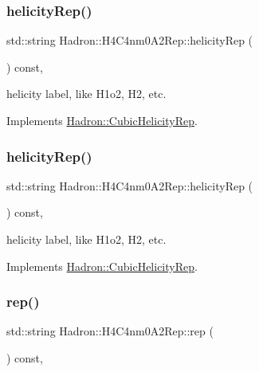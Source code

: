 \subsubsection{\texorpdfstring{helicityRep()}{helicityRep()}\hspace{0.1cm}{\footnotesize\ttfamily [2/3]}}
{\footnotesize\ttfamily std\+::string Hadron\+::\+H4\+C4nm0\+A2\+Rep\+::helicity\+Rep (\begin{DoxyParamCaption}{ }\end{DoxyParamCaption}) const\hspace{0.3cm}{\ttfamily [inline]}, {\ttfamily [virtual]}}

helicity label, like H1o2, H2, etc. 

Implements \mbox{\hyperlink{structHadron_1_1CubicHelicityRep_af1096946b7470edf0a55451cc662f231}{Hadron\+::\+Cubic\+Helicity\+Rep}}.

\mbox{\label{structHadron_1_1H4C4nm0A2Rep_ac6d9fd3861fba10b770f3d953e748006}} 
\subsubsection{\texorpdfstring{helicityRep()}{helicityRep()}\hspace{0.1cm}{\footnotesize\ttfamily [3/3]}}
{\footnotesize\ttfamily std\+::string Hadron\+::\+H4\+C4nm0\+A2\+Rep\+::helicity\+Rep (\begin{DoxyParamCaption}{ }\end{DoxyParamCaption}) const\hspace{0.3cm}{\ttfamily [inline]}, {\ttfamily [virtual]}}

helicity label, like H1o2, H2, etc. 

Implements \mbox{\hyperlink{structHadron_1_1CubicHelicityRep_af1096946b7470edf0a55451cc662f231}{Hadron\+::\+Cubic\+Helicity\+Rep}}.

\mbox{\label{structHadron_1_1H4C4nm0A2Rep_a8da7c1c6f969806290e6452367fce7ea}} 
\subsubsection{\texorpdfstring{rep()}{rep()}\hspace{0.1cm}{\footnotesize\ttfamily [1/5]}}
{\footnotesize\ttfamily std\+::string Hadron\+::\+H4\+C4nm0\+A2\+Rep\+::rep (\begin{DoxyParamCaption}{ }\end{DoxyParamCaption}) const\hspace{0.3cm}{\ttfamily [inline]}, {\ttfamily [virtual]}}



